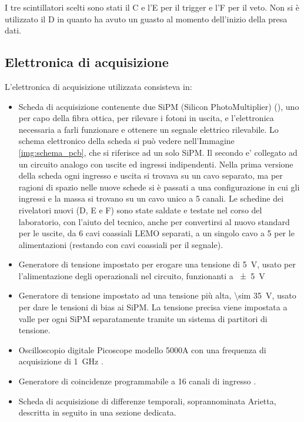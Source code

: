 I tre scintillatori scelti sono stati il C e l'E per il trigger e l'F per il veto. Non si \`e utilizzato il D in quanto ha avuto un guasto al momento dell'inizio della presa dati.

\subsection{Elettronica di acquisizione}

L'elettronica di acquisizione utilizzata consisteva in:
\begin{itemize}
\item Scheda di acquisizione contenente due SiPM (Silicon PhotoMultiplier) (\cite{bib:SiPM}), uno per capo della fibra ottica, per rilevare i fotoni in uscita, e l'elettronica necessaria a farli funzionare e ottenere un segnale elettrico rilevabile. 
Lo schema elettronico della scheda si pu\`o vedere nell'Immagine \ref{img:schema_pcb}, che si riferisce ad un solo SiPM. 
Il secondo e' collegato ad un circuito analogo con uscite ed ingressi indipendenti. 
Nella prima versione della scheda ogni ingresso e uscita si trovava su un cavo separato, ma per ragioni di spazio nelle nuove schede si \`e passati a una configurazione in cui gli ingressi e la massa si trovano su un cavo unico a 5 canali.
Le schedine dei rivelatori nuovi (D, E e F) sono state saldate e testate nel corso del laboratorio, con l'aiuto del tecnico, anche per convertirsi al nuovo standard per le uscite, da 6 cavi coassiali LEMO separati, a un singolo cavo a 5 per le alimentazioni (restando con cavi coassiali per il segnale).


\item Generatore di tensione impostato per erogare una tensione di \SI{5}{\volt}, usato per l'alimentazione degli operazionali nel circuito, funzionanti a \SI{+-5}{\volt}

\item Generatore di tensione impostato ad una tensione pi\`u alta, \SI{\sim 35}{\volt}, usato per dare le tensioni di bias ai SiPM. La tensione precisa viene impostata a valle per ogni SiPM separatamente tramite un sistema di partitori di tensione.

\item Oscilloscopio digitale Picoscope modello 5000A con una frequenza di acquisizione di \SI{1}{\GHz} \cite{bib:datasheet_pico}.

\item Generatore di coincidenze programmabile a 16 canali di ingresso \cite{bib:articolo_garfa}.

\item Scheda di acquisizione di differenze temporali, soprannominata Arietta, descritta in seguito in una  sezione dedicata.

\end{itemize}

